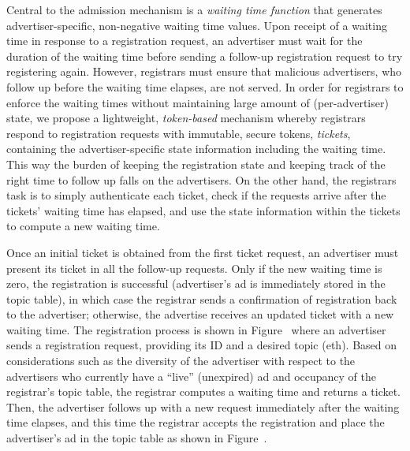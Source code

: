 
Central to the admission mechanism is a \textit{waiting time function} that generates advertiser-specific, non-negative waiting time values. Upon receipt of a waiting time in response to a registration request, an advertiser must wait for the duration of the waiting time before sending a follow-up registration request to try registering again. However, registrars must ensure that malicious advertisers, who follow up before the waiting time elapses, are not served. In order for registrars to enforce the waiting times without maintaining large amount of (\ie per-advertiser) state, we propose a lightweight, \textit{token-based} mechanism whereby registrars respond to registration requests with immutable, secure tokens, \ie \textit{tickets}, containing the advertiser-specific state information including the waiting time. This way the burden of keeping the registration state and keeping track of the right time to follow up falls on the advertisers. On the other hand, the registrars task is to simply authenticate each ticket, check if the requests arrive after the tickets' waiting time has elapsed, and use the state information within the tickets to compute a new waiting time.  


Once an initial ticket is obtained from the first ticket request, an advertiser must present its ticket in all the follow-up requests. Only if the new waiting time is zero, the registration is successful (\ie advertiser's ad is immediately stored in the topic table), in which case the registrar sends a confirmation of registration back to the advertiser; otherwise, the advertise receives an updated ticket with a new waiting time. The registration process is shown in Figure~ where an advertiser sends a registration request, providing its ID and a desired topic (eth). Based on considerations such as the diversity of the advertiser with respect to the advertisers who currently have a ``live'' (\ie unexpired) ad and occupancy of the registrar's topic table, the registrar computes a waiting time and returns a ticket. Then, the advertiser follows up with a new request immediately after the waiting time elapses, and this time the registrar accepts the registration and place the advertiser's ad in the topic table as shown in Figure~.

